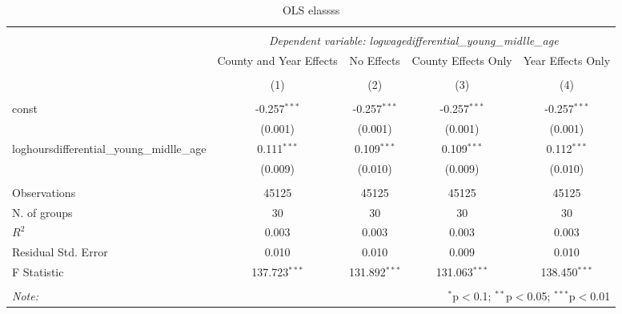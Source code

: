 \documentclass{report}
\begin{document}
\begin{table}[!htbp] \centering
  \caption{OLS elassss}
\begin{tabular}{@{\extracolsep{5pt}}lcccc}
\\[-1.8ex]\hline
\hline \\[-1.8ex]
& \multicolumn{4}{c}{\textit{Dependent variable: logwagedifferential_young_midlle_age}} \
\cr \cline{2-5}
\\[-1.8ex] & \multicolumn{1}{c}{County and Year Effects} & \multicolumn{1}{c}{No Effects} & \multicolumn{1}{c}{County Effects Only} & \multicolumn{1}{c}{Year Effects Only}  \\
\\[-1.8ex] & (1) & (2) & (3) & (4) \\
\hline \\[-1.8ex]
 const & -0.257$^{***}$ & -0.257$^{***}$ & -0.257$^{***}$ & -0.257$^{***}$ \\
& (0.001) & (0.001) & (0.001) & (0.001) \\
 loghoursdifferential_young_midlle_age & 0.111$^{***}$ & 0.109$^{***}$ & 0.109$^{***}$ & 0.112$^{***}$ \\
& (0.009) & (0.010) & (0.009) & (0.010) \\
\hline \\[-1.8ex]
 Observations & 45125 & 45125 & 45125 & 45125 \\
 N. of groups & 30 & 30 & 30 & 30 \\
 $R^2$ & 0.003 & 0.003 & 0.003 & 0.003 \\
 Residual Std. Error & 0.010 & 0.010 & 0.009 & 0.010 \\
 F Statistic & 137.723$^{***}$ & 131.892$^{***}$ & 131.063$^{***}$ & 138.450$^{***}$ \\
\hline
\hline \\[-1.8ex]
\textit{Note:} & \multicolumn{4}{r}{$^{*}$p$<$0.1; $^{**}$p$<$0.05; $^{***}$p$<$0.01} \\
\end{tabular}
\end{table}
\end{document}
